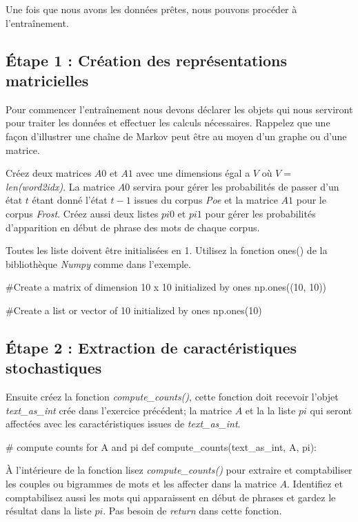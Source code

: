 Une fois que nous avons les données prêtes, nous pouvons procéder à l'entraînement.

\subsection{Étape 1 : Création des représentations matricielles}
Pour commencer l'entraînement nous devons déclarer les objets qui nous serviront pour traiter les données et effectuer les calculs nécessaires. Rappelez que une façon d’illustrer une chaîne de Markov peut être au moyen d'un graphe ou d'une matrice.

Créez deux matrices $A0$ et $A1$ avec une dimensions égal a $V$ où $V = $ \textit{len(word2idx)}. La matrice $A0$ servira pour gérer les probabilités de passer d'un état $t$ étant donné l'état $t-1$ issues du corpus \textit{Poe} et la matrice $A1$ pour le corpus \textit{Frost}. Créez aussi deux listes $pi0$ et $pi1$ pour gérer les probabilités d'apparition en début de phrase des mots de chaque corpus.

Toutes les liste doivent être initialisées en 1. Utilisez la fonction ones() de la bibliothèque \textit{Numpy} comme dans l'exemple.

\begin{python}
#Create a matrix of dimension 10 x 10 initialized by ones
np.ones((10, 10))

#Create a list or vector of 10 initialized by ones
np.ones(10)
\end{python}

\subsection{Étape 2 : Extraction de caractéristiques stochastiques}

Ensuite créez la fonction \textit{compute\_counts()}, cette fonction doit recevoir l'objet \textit{text\_as\_int} crée dans l'exercice précédent; la matrice $A$ et la la liste $pi$ qui seront affectées avec les caractéristiques issues de \textit{text\_as\_int}.
\begin{python}
# compute counts for A and pi
def compute_counts(text_as_int, A, pi):
\end{python}

À l’intérieure de la fonction lisez \textit{compute\_counts()} pour extraire et comptabiliser les couples ou bigrammes de mots et les affecter dans la matrice $A$. Identifiez et comptabilisez aussi les mots qui apparaissent en début de phrases et gardez le résultat dans la liste $pi$. Pas besoin de \textit{return} dans cette fonction. 

